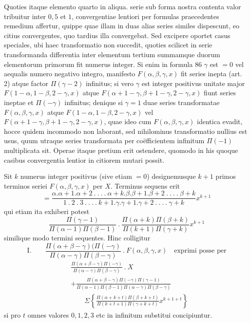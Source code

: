
Quoties itaque elemento quarto in aliqua. serie sub forma nostra contenta
valor tribuitur inter $0{,}5$ et $1$, convergentiae lentiori per formulas praecedentes
remedium affertur, quippe quae illam in duas alias series similes dispescunt,
eo citius convergentes, quo tardius illa convergebat. Sed excipere oportet casus
speciales, ubi haec transformatio non succedit, quoties scilicet in serie transformanda differentia inter elementum tertium summamque duorum elementorum primorum fit numerus integer. Si enim in formula 86 $\gamma$ est $=0$ vel aequalis numero negativo integro, manifesto $F(\alpha,\beta,\gamma,x)$ fit series inepta (art. 2)
atque factor $\Pi(\gamma-2)$ infinitus; si vero $\gamma$ est integer positivus unitate major
$F(1-\alpha,1-\beta,2-\gamma,x)$ atque $F(\alpha+1-\gamma,\beta+1-\gamma,2-\gamma,x)$ fiunt series ineptae et $\Pi(-\gamma)$ infinitus; denique si $\gamma=1$ duae series transformatae $F(\alpha,\beta,\gamma,x)$
atque $F(1-\alpha,1-\beta,2-\gamma,x)$ vel $F(\alpha+1-\gamma,\beta+1-\gamma,2-\gamma,x)$, quae ideo
cum $F(\alpha,\beta,\gamma,x)$ identica evadit, hocce quidem incommodo non laborant, sed
nihilominus transformatio nullius est usus, quum utraque series transformata per
co\"efficientem infinitum $\Pi(-1)$ multiplicata sit. Operae itaque pretium erit ostendere, quomodo in his quoque casibus convergentia lentior in citiorem mutari possit.


Sit $k$ numerus integer positivus (sive etiam $=0$) designemusque $k+1$
primos terminos seriei $F(\alpha,\beta,\gamma,x)$ per $X$. Terminus sequens erit
\[
=\frac{\alpha.\alpha+1.\alpha+2\ .\ .\ .\ .\ \alpha+k.\beta.\beta+1.\beta+2\ .\ .\ .\ .\ \beta+k}
{1\ .\ 2\ .\ 3\ .\ .\ .\ .\ k+1.\gamma.\gamma+1.\gamma+2\ .\ .\ .\ .\ \gamma+k}x^{k+1}
\]
qui etiam ita exhiberi potest
\[
\frac{\Pi(\gamma-1)}{\Pi(\alpha-1)\Pi(\beta-1)}\ .\
\frac{\Pi(\alpha+k)\Pi(\beta+k)}{\Pi(k+1)\Pi(\gamma+k)}x^{k+1}
\]
similique modo termini sequentes. Hinc colligitur
\[
\mathrm{I.}\qquad
\frac{\Pi(\alpha+\beta-\gamma)(\Pi(-\gamma)}{\Pi(\alpha-\gamma)\Pi(\beta-\gamma)}\ .\ F(\alpha,\beta,\gamma,x)
\quad\text{exprimi posse per}
\]
\[
\begin{aligned}&\frac{\Pi(\alpha+\beta-\gamma)\Pi(-\gamma)}{\Pi(\alpha-\gamma)\Pi(\beta-\gamma)}\ .\ X\\&+\frac{\Pi(\alpha+\beta-\gamma)\Pi(-\gamma)\Pi(\gamma-1)}{\Pi(\alpha-1)\Pi(\beta-1)\Pi(\alpha-\gamma)\Pi(\beta-\gamma)}\\&\qquad\Sigma\left\{\frac{\Pi(\alpha+k+t)\Pi(\beta+k+t)}{\Pi(k+t+1)\Pi(\gamma+k+t)}x^{k+1+t}\right\}\end{aligned}
\]
si pro $t$ omnes valores $0,1,2,3$ etc in infinitum substitui concipiuntur.

